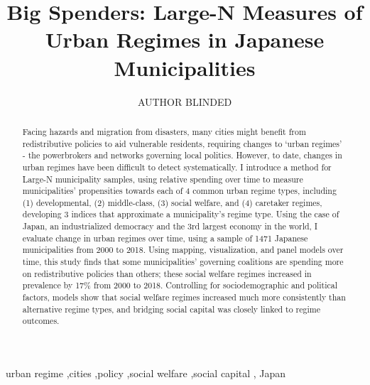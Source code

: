 \documentclass[preprint, 3p,
authoryear]{elsarticle} %
\begin{document}
\begin{frontmatter}

  \title{Big Spenders: Large-N Measures of Urban Regimes in Japanese
Municipalities}
    \author[UNIVERSITY BLINDED]{AUTHOR BLINDED%
  }
  
  \begin{abstract}
  Facing hazards and migration from disasters, many cities might benefit
  from redistributive policies to aid vulnerable residents, requiring
  changes to `urban regimes' - the powerbrokers and networks governing
  local politics. However, to date, changes in urban regimes have been
  difficult to detect systematically. I introduce a method for Large-N
  municipality samples, using relative spending over time to measure
  municipalities' propensities towards each of 4 common urban regime
  types, including (1) developmental, (2) middle-class, (3) social
  welfare, and (4) caretaker regimes, developing 3 indices that
  approximate a municipality's regime type. Using the case of Japan, an
  industrialized democracy and the 3rd largest economy in the world, I
  evaluate change in urban regimes over time, using a sample of 1471
  Japanese municipalities from 2000 to 2018. Using mapping,
  visualization, and panel models over time, this study finds that some
  municipalities' governing coalitions are spending more on
  redistributive policies than others; these social welfare regimes
  increased in prevalence by 17\% from 2000 to 2018. Controlling for
  sociodemographic and political factors, models show that social
  welfare regimes increased much more consistently than alternative
  regime types, and bridging social capital was closely linked to regime
  outcomes.
  \end{abstract}
    \begin{keyword}
    urban regime \sep cities \sep policy \sep social welfare \sep social
capital \sep 
    Japan
  \end{keyword}
  
 \end{frontmatter}

\captionsetup[table]{labelformat=empty}
\captionsetup[figure]{labelformat=empty}
\captionsetup{font=large}
\end{document}
